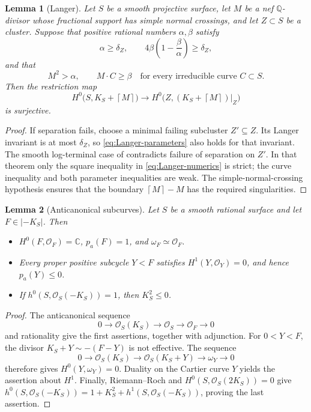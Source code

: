 \documentclass[11pt,reqno]{amsart}
\numberwithin{equation}{section}
\newtheorem{lemma}[lemma]{Lemma}
\theoremstyle{remark}
\newcommand{\sshf}[1]{\mathcal{O}_{#1}}
\newcommand{\pa}{p_a}
\newcommand{\ceil}[1]{\left\lceil #1\right\rceil}
\begin{document}
\begin{lemma}[Langer]
\label{lem:Langer-rounded}
Let \(S\) be a smooth projective surface, let \(M\) be a nef
\(\mathbb{Q}\)-divisor whose fractional support has simple normal crossings,
and let \(Z\subset S\) be a cluster. Suppose that positive rational
numbers \(\alpha,\beta\) satisfy
\begin{equation}\label{eq:Langer-parameters}
 \alpha\geq\delta_Z,
 \qquad 4\beta\left(1-\frac{\beta}{\alpha}\right)\geq\delta_Z,
\end{equation}
and that
\begin{equation}\label{eq:Langer-numerics}
 M^2>\alpha,
 \qquad M\cdot C\geq\beta
 \quad\text{for every irreducible curve }C\subset S.
\end{equation}
Then the restriction map
\[
 H^0\bigl(S,K_S+\ceil M\bigr)\longrightarrow
 H^0\bigl(Z,(K_S+\ceil M)|_Z\bigr)
\]
is surjective.
\end{lemma}

\begin{proof}
If separation fails, choose a minimal failing subcluster
\(Z'\subseteq Z\). Its Langer invariant is at most \(\delta_Z\),
so \eqref{eq:Langer-parameters} also holds for that invariant.
The smooth log-terminal case of \cite[Theorem 0.2]{Langer}
contradicts failure of separation on \(Z'\). In that theorem only
the square inequality in \eqref{eq:Langer-numerics} is strict;
the curve inequality and both parameter inequalities are weak.
The simple-normal-crossing hypothesis ensures that the boundary
\(\ceil M-M\) has the required singularities.
\end{proof}

\begin{lemma}[Anticanonical subcurves]\label{lem:anti-subcurves}
Let \(S\) be a smooth rational surface and let \(F\in|-K_S|\).
Then
\begin{itemize}
    \item[(i)] \(H^0(F,\sshf{F})=\mathbb{C}\), \(\pa(F)=1\), and
\(\omega_F\simeq\sshf{F}\).
    \item[(ii)] Every proper positive subcycle \(Y<F\)
satisfies \(H^1(Y,\sshf{Y})=0\), and hence \(\pa(Y)\leq0\).
    \item[(iii)] If \(h^0(S,\sshf{S}(-K_S))=1\), then \(K_S^2\leq0\).
\end{itemize}
\end{lemma}
\begin{proof}
The anticanonical sequence
\[
 0\longrightarrow\sshf{S}(K_S)\longrightarrow\sshf{S}
 \longrightarrow\sshf{F}\longrightarrow0
\]
and rationality give the first assertions, together with adjunction.
For \(0<Y<F\), the divisor \(K_S+Y\sim-(F-Y)\) is not effective.
The sequence
\[
 0\longrightarrow\sshf{S}(K_S)\longrightarrow\sshf{S}(K_S+Y)
 \longrightarrow\omega_Y\longrightarrow0
\]
therefore gives \(H^0(Y,\omega_Y)=0\). Duality on the Cartier curve
\(Y\) yields the assertion about \(H^1\). Finally, Riemann--Roch and
\(H^0(S,\sshf{S}(2K_S))=0\) give
\(h^0(S,\sshf{S}(-K_S))=1+K_S^2
+h^1(S,\sshf{S}(-K_S))\), proving the last assertion.
\end{proof}
\end{document}

